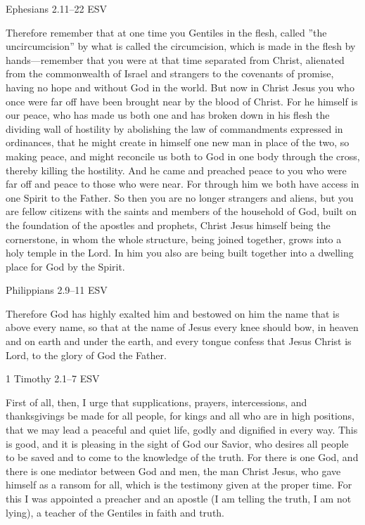 \documentclass[
]{article}
\newcommand{\RL}[1]{\beginR #1\endR}
\begin{document}
Ephesians 2.11--22 ESV

Therefore remember that at one time you Gentiles in the flesh, called
\RL{''}the uncircumcision'' by what is called the circumcision, which is
made in the flesh by hands---remember that you were at that time
separated from Christ, alienated from the commonwealth of Israel and
strangers to the covenants of promise, having no hope and without God in
the world. But now in Christ Jesus you who once were far off have been
brought near by the blood of Christ. For he himself is our peace, who
has made us both one and has broken down in his flesh the dividing wall
of hostility by abolishing the law of commandments expressed in
ordinances, that he might create in himself one new man in place of the
two, so making peace, and might reconcile us both to God in one body
through the cross, thereby killing the hostility. And he came and
preached peace to you who were far off and peace to those who were near.
For through him we both have access in one Spirit to the Father. So then
you are no longer strangers and aliens, but you are fellow citizens with
the saints and members of the household of God, built on the foundation
of the apostles and prophets, Christ Jesus himself being the
cornerstone, in whom the whole structure, being joined together, grows
into a holy temple in the Lord. In him you also are being built together
into a dwelling place for God by the Spirit.

Philippians 2.9--11 ESV

Therefore God has highly exalted him and bestowed on him the name that
is above every name, so that at the name of Jesus every knee should bow,
in heaven and on earth and under the earth, and every tongue confess
that Jesus Christ is Lord, to the glory of God the Father.

1 Timothy 2.1--7 ESV

First of all, then, I urge that supplications, prayers, intercessions,
and thanksgivings be made for all people, for kings and all who are in
high positions, that we may lead a peaceful and quiet life, godly and
dignified in every way. This is good, and it is pleasing in the sight of
God our Savior, who desires all people to be saved and to come to the
knowledge of the truth. For there is one God, and there is one mediator
between God and men, the man Christ Jesus, who gave himself as a ransom
for all, which is the testimony given at the proper time. For this I was
appointed a preacher and an apostle (I am telling the truth, I am not
lying), a teacher of the Gentiles in faith and truth.
\end{document}
